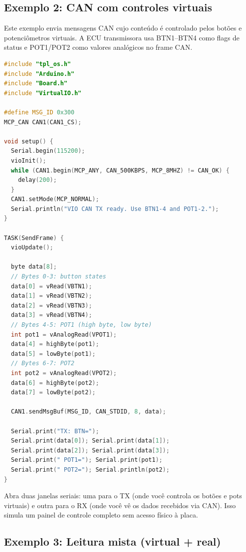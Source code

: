 \documentclass[12pt,a4paper]{article}
\begin{document}
\subsection{Exemplo 2: CAN com controles virtuais}

Este exemplo envia mensagens CAN cujo conteúdo é controlado pelos botões e potenciômetros virtuais. A ECU transmissora usa BTN1--BTN4 como flags de status e POT1/POT2 como valores analógicos no frame CAN.

\begin{lstlisting}[language=C++,caption={vio\_can\_tx.cpp (trecho relevante)}]
#include "tpl_os.h"
#include "Arduino.h"
#include "Board.h"
#include "VirtualIO.h"

#define MSG_ID 0x300
MCP_CAN CAN1(CAN1_CS);

void setup() {
  Serial.begin(115200);
  vioInit();
  while (CAN1.begin(MCP_ANY, CAN_500KBPS, MCP_8MHZ) != CAN_OK) {
    delay(200);
  }
  CAN1.setMode(MCP_NORMAL);
  Serial.println("VIO CAN TX ready. Use BTN1-4 and POT1-2.");
}

TASK(SendFrame) {
  vioUpdate();

  byte data[8];
  // Bytes 0-3: button states
  data[0] = vRead(VBTN1);
  data[1] = vRead(VBTN2);
  data[2] = vRead(VBTN3);
  data[3] = vRead(VBTN4);
  // Bytes 4-5: POT1 (high byte, low byte)
  int pot1 = vAnalogRead(VPOT1);
  data[4] = highByte(pot1);
  data[5] = lowByte(pot1);
  // Bytes 6-7: POT2
  int pot2 = vAnalogRead(VPOT2);
  data[6] = highByte(pot2);
  data[7] = lowByte(pot2);

  CAN1.sendMsgBuf(MSG_ID, CAN_STDID, 8, data);

  Serial.print("TX: BTN=");
  Serial.print(data[0]); Serial.print(data[1]);
  Serial.print(data[2]); Serial.print(data[3]);
  Serial.print(" POT1="); Serial.print(pot1);
  Serial.print(" POT2="); Serial.println(pot2);
}
\end{lstlisting}

\begin{dicabox}
Abra duas janelas seriais: uma para o TX (onde você controla os botões e pots virtuais) e outra para o RX (onde você vê os dados recebidos via CAN). Isso simula um painel de controle completo sem acesso físico à placa.
\end{dicabox}

\subsection{Exemplo 3: Leitura mista (virtual + real)}
\end{document}
